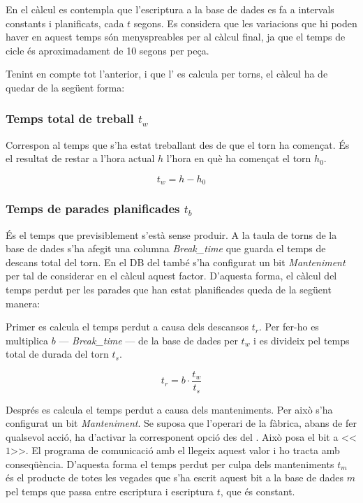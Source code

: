 \documentclass{tfgitic}[2022/06/30]
\begin{document}
En el càlcul es contempla que l'escriptura a la base de dades es fa a intervals constants i planificats, cada $t$ segons. Es considera que les variacions que hi poden haver en aquest temps són menyspreables per al càlcul final, ja que el temps de cicle és aproximadament de 10 segons per peça.

Tenint en compte tot l'anterior, i que l' es calcula per torns, el càlcul ha de quedar de la següent forma:

\subsubsection{Temps total de treball $t_{w}$}
Correspon al temps que s'ha estat treballant des de que el torn ha començat. És el resultat de restar a l'hora actual $h$ l'hora en què ha començat el torn $h_{0}$.

\[t_{w} = h - h_{0}\]

\subsubsection{Temps de parades planificades $t_{b}$}
És el temps que previsiblement s'està sense produir. A la taula de torns de la base de dades s'ha afegit una columna \emph{Break\_time} que guarda el temps de descans total del torn. En el DB del  també s'ha configurat un bit \emph{Manteniment} per tal de considerar en el càlcul aquest factor. D'aquesta forma, el càlcul del temps perdut per les parades que han estat planificades queda de la següent manera: 

Primer es calcula el temps perdut a causa dels descansos $t_{r}$. Per fer-ho es multiplica $b$ --- \emph{Break\_time} --- de la base de dades per $t_{w}$ i es divideix pel temps total de durada del torn $t_{s}$. 

\[t_{r} = b \cdot \frac{t_{w}}{t_{s}}\]

Després es calcula el temps perdut a causa dels manteniments. Per això s'ha configurat un bit \emph{Manteniment}. Se suposa que l'operari de la fàbrica, abans de fer qualsevol acció, ha d'activar la corresponent opció des del . Això posa el bit a <<$1$>>. El programa de comunicació amb el  llegeix aquest valor i ho tracta amb conseqüència. D'aquesta forma el temps perdut per culpa dels manteniments $t_{m}$ és el producte de totes les vegades que s'ha escrit aquest bit a la base de dades $m$ pel temps que passa entre escriptura i escriptura $t$, que és constant.
\end{document}

